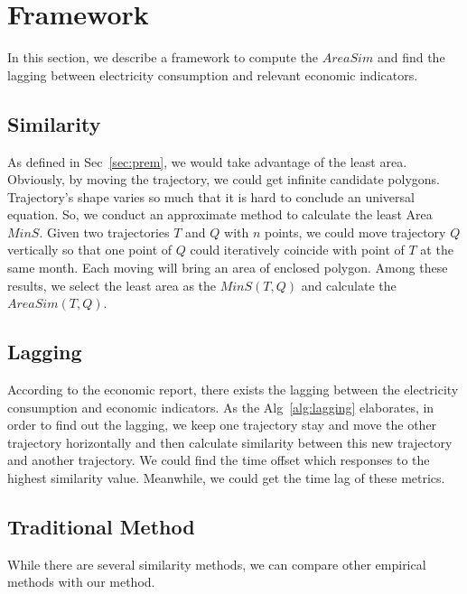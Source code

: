 


\section{Framework} \label{sec:alg}
In this section, we describe a framework to compute the $AreaSim$ and  find the lagging between electricity consumption and relevant economic indicators.

\subsection{Similarity}
As defined in Sec~\ref{sec:prem}, we would take advantage of the least area. Obviously, by moving the trajectory, we could get infinite candidate polygons. Trajectory's shape varies so much that it is hard to conclude an universal equation. So, we conduct an approximate method to calculate the least Area $MinS$. Given two trajectories $T$ and $Q$ with $n$ points, we could move trajectory $Q$ vertically so that one point of $Q$ could iteratively coincide with point of $T$ at the same month. Each moving will bring an area of enclosed polygon. Among these results, we select the least area as the $MinS(T, Q)$ and calculate the $AreaSim(T, Q)$.  

\subsection{Lagging}
According to the economic report, there exists the lagging between the electricity consumption and economic indicators. As the Alg~\ref{alg:lagging} elaborates, in order to find out the lagging, we keep one trajectory stay and move the other trajectory horizontally and then calculate similarity between this new trajectory and another trajectory. We could find the time offset which responses to the highest similarity value. Meanwhile, we could get the time lag of these metrics. 

\subsection{Traditional Method}
While there are several similarity methods, we can compare other empirical methods with our method. 


